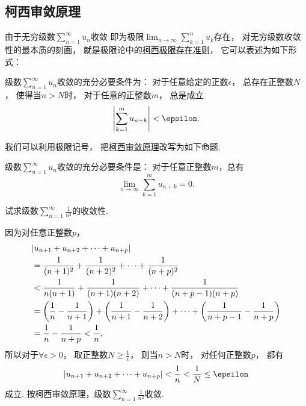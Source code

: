 \subsection{柯西审敛原理}
由于无穷级数\(\sum_{n=1}^\infty u_n\)收敛
即为极限\(\lim_{n\to\infty} \sum_{k=1}^n u_k\)存在，
对无穷级数收敛性的最本质的刻画，
就是极限论中的\hyperref[theorem:极限.函数的柯西极限存在准则]{柯西极限存在准则}，
它可以表述为如下形式：
\begin{theorem}[柯西审敛原理]\label{theorem:无穷级数.级数的柯西审敛原理}
级数\(\sum_{n=1}^\infty u_n\)收敛的充分必要条件为：
对于任意给定的正数\(\epsilon\)，
总存在正整数\(N\)，
使得当\(n>N\)时，
对于任意的正整数\(m\)，
总是成立\[
	\abs{ \sum_{k=1}^m u_{n+k} }
	< \epsilon.
\]
\end{theorem}

我们可以利用极限记号，
把\hyperref[theorem:无穷级数.级数的柯西审敛原理]{柯西审敛原理}改写为如下命题.
\begin{proposition}
级数\(\sum_{n=1}^\infty u_n\)收敛的充分必要条件是：
对于任意正整数\(m\)，总有\[
	\lim_{n\to\infty} \sum_{k=1}^m u_{n+k} = 0.
\]
\end{proposition}

\begin{example}\label{example:无穷级数.zeta2的敛散性}
试求级数\(\sum_{n=1}^\infty \frac{1}{n^2}\)的收敛性.
\begin{solution}
因为对任意正整数\(p\)，\begin{align*}
	&\abs{u_{n+1}+u_{n+2}+\dotsb+u_{n+p}} \\
	&=\frac{1}{(n+1)^2}+\frac{1}{(n+2)^2}+\dotsb+\frac{1}{(n+p)^2} \\
	&<\frac{1}{n(n+1)}+\frac{1}{(n+1)(n+2)}+\dotsb+\frac{1}{(n+p-1)(n+p)} \\
	&=\left(\frac{1}{n}-\frac{1}{n+1}\right)
		+\left(\frac{1}{n+1}-\frac{1}{n+2}\right)
		+\dotsb+\left(\frac{1}{n+p-1}-\frac{1}{n+p}\right) \\
	&=\frac{1}{n}-\frac{1}{n+p} < \frac{1}{n},
\end{align*}
所以对于\(\forall \epsilon > 0\)，
取正整数\(N \geq \frac{1}{\epsilon}\)，
则当\(n > N\)时，
对任何正整数\(p\)，
都有\[
	\abs{u_{n+1}+u_{n+2}+\dotsb+u_{n+p}}
	< \frac{1}{n}
	< \frac{1}{N}
	\leq \epsilon
\]成立.
按柯西审敛原理，级数\(\sum_{n=1}^\infty \frac{1}{n^2}\)收敛.
\end{solution}
\end{example}

